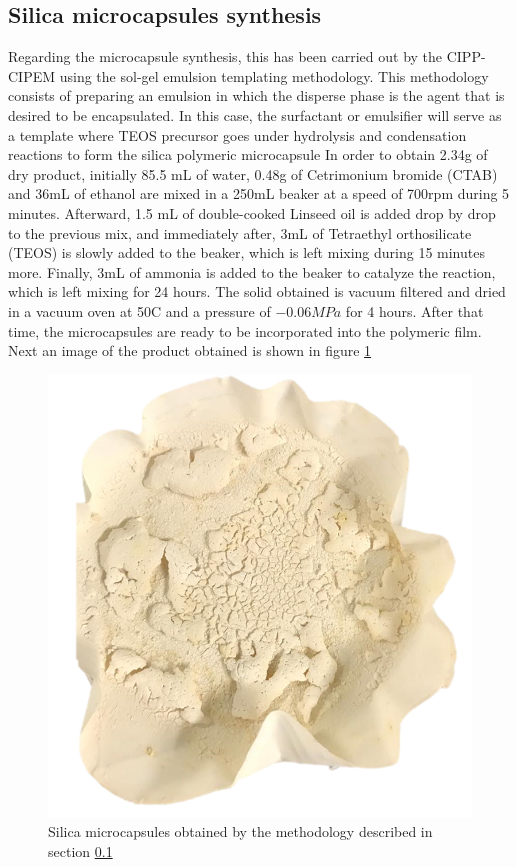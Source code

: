 \begin{refsection}
\subsection{Silica microcapsules synthesis}\label{sec:capusules}
Regarding the microcapsule synthesis, this has been carried out by the CIPP-CIPEM using the sol-gel emulsion templating methodology. This methodology consists of preparing an emulsion in which the disperse phase is the agent that is desired to be encapsulated. In this case, the surfactant or emulsifier will serve as a template where TEOS precursor goes under hydrolysis and condensation reactions to form the silica polymeric microcapsule \cites{GonzalezPungo2018EvaluacionActivos,GomezAlfonzo2018AceiteOxigeno}  In order to obtain 2.34g of dry product, initially 85.5 mL of water, 0.48g of Cetrimonium bromide (CTAB) and 36mL of ethanol are mixed in a 250mL beaker at a speed of 700rpm during 5 minutes. Afterward, 1.5 mL of double-cooked Linseed oil is added drop by drop to the previous mix, and immediately after, 3mL of Tetraethyl orthosilicate (TEOS) is slowly added to the beaker, which is left mixing during 15 minutes more. Finally, 3mL of ammonia is added to the beaker to catalyze the reaction, which is left mixing for 24 hours. The solid obtained is vacuum filtered and dried in a vacuum oven at 50\degree C and a pressure of $-0.06 MPa$ for 4 hours. After that time, the microcapsules are ready to be incorporated into the polymeric film. Next an image of the product obtained is shown in figure \ref{fig:capsules}

\begin{figure}[ht]
    \centering
    \includegraphics[width=0.3\linewidth]{Documento_Latex/Imagenes/capsulas.png}
    \caption{Silica microcapsules obtained by the methodology described in section \ref{sec:capusules}}
    \label{fig:capsules}
\end{figure}


\end{refsection}

